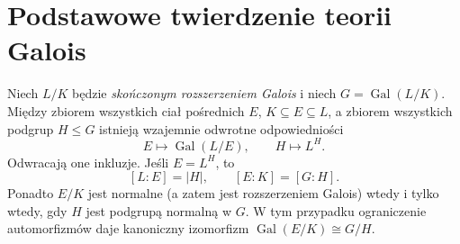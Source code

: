 \section{Podstawowe twierdzenie teorii Galois}
\begin{twierdzenie}
\label{aa:tw:fundamental-galois}
Niech $L/K$ będzie \emph{skończonym rozszerzeniem Galois}
i niech $G=\operatorname{Gal}(L/K)$. Między zbiorem
wszystkich ciał pośrednich $E$, $K\subseteq E\subseteq L$,
a zbiorem wszystkich podgrup $H\le G$ istnieją
wzajemnie odwrotne odpowiedniości
\[
E\longmapsto\operatorname{Gal}(L/E),\qquad
H\longmapsto L^H.
\]
Odwracają one inkluzje. Jeśli $E=L^H$, to
\[
[L:E]=|H|,\qquad [E:K]=[G:H].
\]
Ponadto $E/K$ jest normalne (a zatem jest rozszerzeniem
Galois) wtedy i tylko wtedy, gdy $H$ jest podgrupą normalną
w $G$. W tym przypadku ograniczenie automorfizmów daje
kanoniczny izomorfizm
$\operatorname{Gal}(E/K)\cong G/H$.
\end{twierdzenie}
